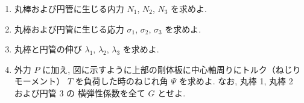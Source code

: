 \begin{enumerate}[label=(\arabic*)]
  \item 丸棒および円管に生じる内力 $N_1$, $N_2$, $N_3$ を求めよ.

  \item 丸棒および円管に生じる応力 $\sigma_1$, $\sigma_2$, $\sigma_3$ を求めよ.

  \item 丸棒と円管の伸び $\lambda_1$, $\lambda_2$, $\lambda_3$ を求めよ.

  \item 外力 $P$ に加え, 図に示すように上部の剛体板に中心軸周りにトルク（ねじりモーメント）
        $T$ を負荷した時のねじれ角 $\Psi$ を求めよ. なお, 丸棒 1, 丸棒 2 および円管 3 の
        横弾性係数を全て $G$ とせよ.
\end{enumerate}
